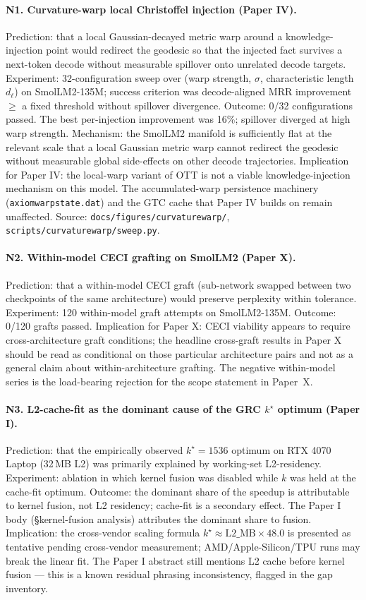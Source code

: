 \documentclass[11pt]{article}
\begin{document}
\paragraph{N1. Curvature-warp local Christoffel injection (Paper IV).} Prediction: that a local Gaussian-decayed metric warp around a knowledge-injection point would redirect the geodesic so that the injected fact survives a next-token decode without measurable spillover onto unrelated decode targets. Experiment: 32-configuration sweep over (warp strength, $\sigma$, characteristic length $d_\ell$) on SmolLM2-135M; success criterion was decode-aligned MRR improvement $\geq$ a fixed threshold without spillover divergence. Outcome: 0/32 configurations passed. The best per-injection improvement was 16\%; spillover diverged at high warp strength. Mechanism: the SmolLM2 manifold is sufficiently flat at the relevant scale that a local Gaussian metric warp cannot redirect the geodesic without measurable global side-effects on other decode trajectories. Implication for Paper IV: the local-warp variant of OTT is not a viable knowledge-injection mechanism on this model. The accumulated-warp persistence machinery (\texttt{axiomwarpstate.dat}) and the GTC cache that Paper IV builds on remain unaffected. Source: \texttt{docs/figures/curvaturewarp/}, \texttt{scripts/curvaturewarp/sweep.py}.

\paragraph{N2. Within-model CECI grafting on SmolLM2 (Paper X).} Prediction: that a within-model CECI graft (sub-network swapped between two checkpoints of the same architecture) would preserve perplexity within tolerance. Experiment: 120 within-model graft attempts on SmolLM2-135M. Outcome: 0/120 grafts passed. Implication for Paper X: CECI viability appears to require cross-architecture graft conditions; the headline cross-graft results in Paper X should be read as conditional on those particular architecture pairs and not as a general claim about within-architecture grafting. The negative within-model series is the load-bearing rejection for the scope statement in Paper~X.

\paragraph{N3. L2-cache-fit as the dominant cause of the GRC $k^\star$ optimum (Paper I).} Prediction: that the empirically observed $k^\star = 1536$ optimum on RTX 4070 Laptop (32\,MB L2) was primarily explained by working-set L2-residency. Experiment: ablation in which kernel fusion was disabled while $k$ was held at the cache-fit optimum. Outcome: the dominant share of the speedup is attributable to kernel fusion, not L2 residency; cache-fit is a secondary effect. The Paper I body (\S kernel-fusion analysis) attributes the dominant share to fusion. Implication: the cross-vendor scaling formula $k^\star \approx \mathrm{L2\_MB} \times 48.0$ is presented as tentative pending cross-vendor measurement; AMD/Apple-Silicon/TPU runs may break the linear fit. The Paper I abstract still mentions L2 cache before kernel fusion --- this is a known residual phrasing inconsistency, flagged in the gap inventory.
\end{document}
